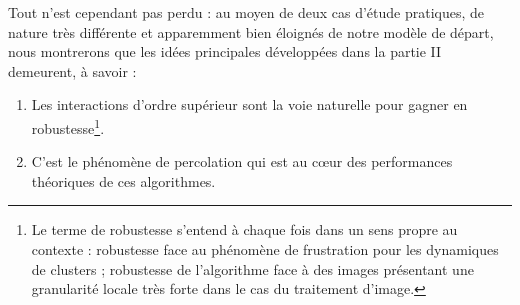 \documentclass{these-ISSS} %
\begin{document}
Tout n'est cependant pas perdu : au moyen de deux cas d'étude pratiques, de nature très différente et apparemment bien éloignés de notre modèle de départ, nous montrerons que les idées principales développées dans la partie II demeurent, à savoir : 
\begin{enumerate}
    \item Les interactions d'ordre supérieur sont la voie naturelle pour gagner en robustesse\footnote{Le terme de robustesse s'entend à chaque fois dans un sens propre au contexte : robustesse face au phénomène de frustration pour les dynamiques de clusters ; robustesse de l'algorithme face à des images présentant une granularité locale très forte dans le cas du traitement d'image.}.
    \item C'est le phénomène de percolation qui est au cœur des performances théoriques de ces algorithmes.
\end{enumerate}




\end{document}
